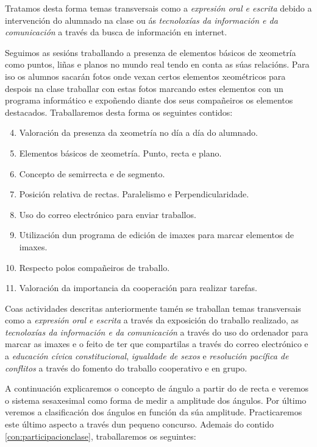 Tratamos desta forma temas transversais como a \emph{expresión oral e escrita} debido a intervención do alumnado na clase ou ás \emph{tecnoloxías da información e da comunicación} a través da busca de información en internet.

Seguimos as sesións traballando a presenza de elementos básicos de xeometría como puntos, liñas e planos no mundo real tendo en conta as súas relacións. Para iso os alumnos sacarán fotos onde vexan certos elementos xeométricos para despois na clase traballar con estas fotos marcando estes elementos con un programa informático e expoñendo diante dos seus compañeiros os elementos destacados. Traballaremos desta forma os seguintes contidos:

\begin{enumerate}[label=\bfseries Con\arabic*, align=left, leftmargin=1.5cm]
    \setcounter{enumi}{3}
    \item\label{con:xeometriacontorna} Valoración da presenza da xeometría no día a día do alumnado.
    \item\label{con:elementosbasicos} Elementos básicos de xeometría. Punto, recta e plano.
    \item\label{con:semirecta} Concepto de semirrecta e de segmento.
    \item\label{con:posicionrectas} Posición relativa de rectas. Paralelismo e Perpendicularidade.
    \item\label{con:email} Uso do correo electrónico para enviar traballos.
    \item\label{con:gimp} Utilización dun programa de edición de imaxes para marcar elementos de imaxes.
    \item\label{con:companheiros} Respecto polos compañeiros de traballo.
    \item\label{con:cooperacion} Valoración da importancia da cooperación para realizar tarefas.
\end{enumerate}

Coas actividades descritas anteriormente tamén se traballan temas transversais como a \emph{expresión oral e escrita} a través da exposición do traballo realizado, as \emph{tecnoloxías da información e da comunicación} a través do uso do ordenador para marcar as imaxes e o feito de ter que compartilas a través do correo electrónico e a \emph{educación cívica constitucional}, \emph{igualdade de sexos} e \emph{resolución pacífica de conflitos} a través do fomento do traballo cooperativo e en grupo.

A continuación explicaremos o concepto de ángulo a partir do de recta e veremos o sistema sesaxesimal como forma de medir a amplitude dos ángulos. Por último veremos a clasificación dos ángulos en función da súa amplitude. Practicaremos este último aspecto a través dun pequeno concurso. Ademais do contido \ref{con:participacionclase}, traballaremos os seguintes:

